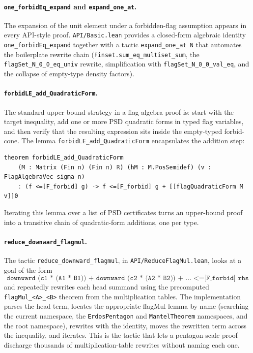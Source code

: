 \documentclass{article}
\newcommand{\lean}[1]{\texttt{#1}}
\begin{document}
\paragraph{\lean{one\_forbidEq\_expand} and \lean{expand\_one\_at}.}
The expansion of the unit element under a forbidden-flag assumption appears
in every API-style proof.  \lean{API/Basic.lean} provides a closed-form
algebraic identity \lean{one\_forbidEq\_expand} together with a tactic
\lean{expand\_one\_at N} that automates the boilerplate rewrite chain
(\lean{Finset.sum\_eq\_multiset\_sum}, the \lean{flagSet\_N\_0\_0\_eq\_univ}
rewrite, simplification with \lean{flagSet\_N\_0\_0\_val\_eq}, and the
collapse of empty-type density factors).

\paragraph{\lean{forbidLE\_add\_QuadraticForm}.}
The standard upper-bound strategy in a flag-algebra proof is: start with the
target inequality, add one or more PSD quadratic forms in typed flag
variables, and then verify that the resulting expression sits inside the
empty-typed forbid-cone.  The lemma
\lean{forbidLE\_add\_QuadraticForm} encapsulates the addition step:
\begin{lstlisting}
theorem forbidLE_add_QuadraticForm
    (M : Matrix (Fin n) (Fin n) R) (hM : M.PosSemidef) (v : FlagAlgebraVec sigma n)
    : (f <=[F_forbid] g) -> f <=[F_forbid] g + [[flagQuadraticForm M v]]0
\end{lstlisting}
Iterating this lemma over a list of PSD certificates turns an upper-bound
proof into a transitive chain of quadratic-form additions, one per type.

\paragraph{\lean{reduce\_downward\_flagmul}.}
The tactic \lean{reduce\_downward\_flagmul}, in
\lean{API/ReduceFlagMul.lean}, looks at a goal of the form
\[
  \lean{downward (c1 * (A1 * B1)) + downward (c2 * (A2 * B2)) + ... <=[F_forbid] rhs}
\]
and repeatedly rewrites each head summand using the precomputed
\lean{flagMul\_<A>\_<B>} theorem from the multiplication tables.  The
implementation parses the head term, locates the appropriate flagMul lemma
by name (searching the current namespace, the \lean{ErdosPentagon} and
\lean{MantelTheorem} namespaces, and the root namespace), rewrites with the
identity, moves the rewritten term across the inequality, and iterates.  This
is the tactic that lets a pentagon-scale proof discharge thousands of
multiplication-table rewrites without naming each one.
\end{document}
